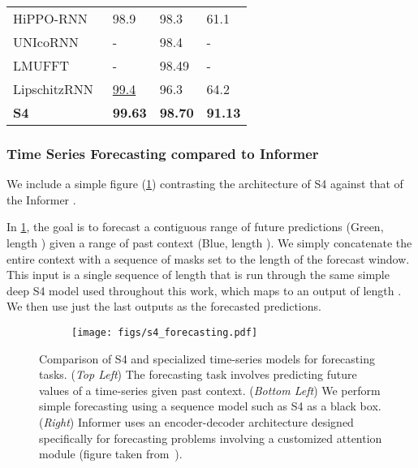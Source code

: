 \documentclass{article}
\newcommand{\methodabbrv}{S4}
\begin{document}
\begin{table}[t]
\begin{tabular}{@{}llll@{}}
    HiPPO-RNN~\citep{gu2020hippo}                              & 98.9              & 98.3              & 61.1              \\
    UNIcoRNN~\citep{rusch2021unicornn}                         & -                 & 98.4              & -                 \\
    LMUFFT~\citep{chilkuri2021parallelizing}                   & -                 & 98.49             & -                 \\
    LipschitzRNN~\citep{erichson2021lipschitz}                 & \underline{99.4}  & 96.3              & 64.2              \\
    \midrule
    \textbf{\methodabbrv}                                                & \textbf{99.63}    & \textbf{98.70} & \textbf{91.13}    \\
    \bottomrule
  \end{tabular}
  \label{tab:image-full}
\end{table}


\subsubsection{Time Series Forecasting compared to Informer}
\label{sec:experiment-details-general-informer}

We include a simple figure (\cref{fig:s4-architecture}) contrasting the architecture of \methodabbrv{} against that of the Informer \citep{haoyietal-informer-2021}.

In \cref{fig:s4-architecture},
the goal is to forecast a contiguous range of future predictions (Green, length  )
given a range of past context (Blue, length  ).
We simply concatenate the entire context with a sequence of masks set to the length of the forecast window.
This input is a single sequence of length  that is run through the same simple deep \methodabbrv{} model used throughout this work,
which maps to an output of length  .
We then use just the last  outputs as the forecasted predictions.


\begin{figure}[t]
    \centering
    \begin{subfigure}{\linewidth}\centering
      \texttt{[image: figs/s4\_forecasting.pdf]}
    \end{subfigure}
    \caption{Comparison of \methodabbrv{} and specialized time-series models for forecasting tasks. (\textit{Top Left}) The forecasting task involves predicting future values of a time-series given past context. (\textit{Bottom Left}) We perform simple forecasting using a sequence model such as \methodabbrv{} as a black box. (\textit{Right}) Informer uses an encoder-decoder architecture designed specifically for forecasting problems involving a customized attention module (figure taken from~\citet{haoyietal-informer-2021}).}
    \label{fig:s4-architecture}
\end{figure}
\end{document}
